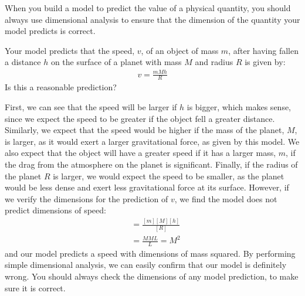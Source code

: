 When you build a model to predict the value of a physical quantity, you should always use dimensional analysis to ensure that the dimension of the quantity your model predicts is correct.

\begin{example}{Your model predicts that the speed, $v$, of an object of mass $m$, after having fallen a distance $h$ on the surface of a planet with mass $M$ and radius $R$ is given by:
\begin{align*}
v = \frac{mMh}{R}
\end{align*}
Is this a reasonable prediction?
}

First, we can see that the speed will be larger if $h$ is bigger, which makes sense, since we expect the speed to be greater if the object fell a greater distance. Similarly, we expect that the speed would be higher if the mass of the planet, $M$, is larger, as it would exert a larger gravitational force, as given by this model. We also expect that the object will have a greater speed if it has a larger mass, $m$, if the drag from the atmosphere on the planet is significant. Finally, if the radius of the planet $R$ is larger, we would expect the speed to be smaller, as the planet would be less dense and exert less gravitational force at its surface. However, if we verify the dimensions for the prediction of $v$, we find the model does not predict dimensions of speed:
\begin{align*}
[v] &= \frac{[m][M][h]}{[R]}\\
&=\frac{MML}{L}=M^2
\end{align*} 
and our model predicts a speed with dimensions of mass squared. By performing simple dimensional analysis, we can easily confirm that our model is definitely wrong. You should always check the dimensions of any model prediction, to make sure it is correct.
\end{example}


